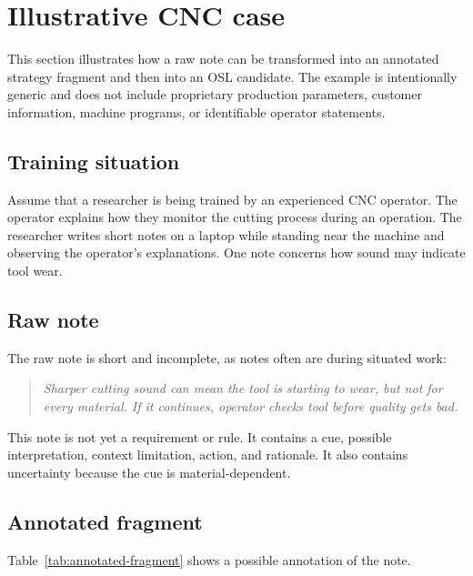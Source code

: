 \section{Illustrative CNC case}
\label{sec:case}

This section illustrates how a raw note can be transformed into an annotated strategy fragment and then into an OSL candidate. The example is intentionally generic and does not include proprietary production parameters, customer information, machine programs, or identifiable operator statements.

\subsection{Training situation}

Assume that a researcher is being trained by an experienced CNC operator. The operator explains how they monitor the cutting process during an operation. The researcher writes short notes on a laptop while standing near the machine and observing the operator's explanations. One note concerns how sound may indicate tool wear.

\subsection{Raw note}

The raw note is short and incomplete, as notes often are during situated work:

\begin{quote}
\emph{Sharper cutting sound can mean the tool is starting to wear, but not for every material. If it continues, operator checks tool before quality gets bad.}
\end{quote}

This note is not yet a requirement or rule. It contains a cue, possible interpretation, context limitation, action, and rationale. It also contains uncertainty because the cue is material-dependent.

\subsection{Annotated fragment}

Table~\ref{tab:annotated-fragment} shows a possible annotation of the note.

